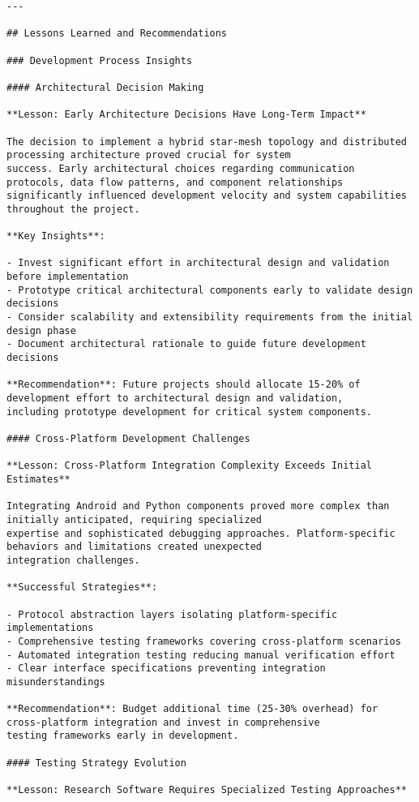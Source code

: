 \documentclass[12pt,a4paper]{report}
\begin{document}
\begin{verbatim}
---

## Lessons Learned and Recommendations

### Development Process Insights

#### Architectural Decision Making

**Lesson: Early Architecture Decisions Have Long-Term Impact**

The decision to implement a hybrid star-mesh topology and distributed processing architecture proved crucial for system
success. Early architectural choices regarding communication protocols, data flow patterns, and component relationships
significantly influenced development velocity and system capabilities throughout the project.

**Key Insights**:

- Invest significant effort in architectural design and validation before implementation
- Prototype critical architectural components early to validate design decisions
- Consider scalability and extensibility requirements from the initial design phase
- Document architectural rationale to guide future development decisions

**Recommendation**: Future projects should allocate 15-20% of development effort to architectural design and validation,
including prototype development for critical system components.

#### Cross-Platform Development Challenges

**Lesson: Cross-Platform Integration Complexity Exceeds Initial Estimates**

Integrating Android and Python components proved more complex than initially anticipated, requiring specialized
expertise and sophisticated debugging approaches. Platform-specific behaviors and limitations created unexpected
integration challenges.

**Successful Strategies**:

- Protocol abstraction layers isolating platform-specific implementations
- Comprehensive testing frameworks covering cross-platform scenarios
- Automated integration testing reducing manual verification effort
- Clear interface specifications preventing integration misunderstandings

**Recommendation**: Budget additional time (25-30% overhead) for cross-platform integration and invest in comprehensive
testing frameworks early in development.

#### Testing Strategy Evolution

**Lesson: Research Software Requires Specialized Testing Approaches**


\end{verbatim}
\end{document}
